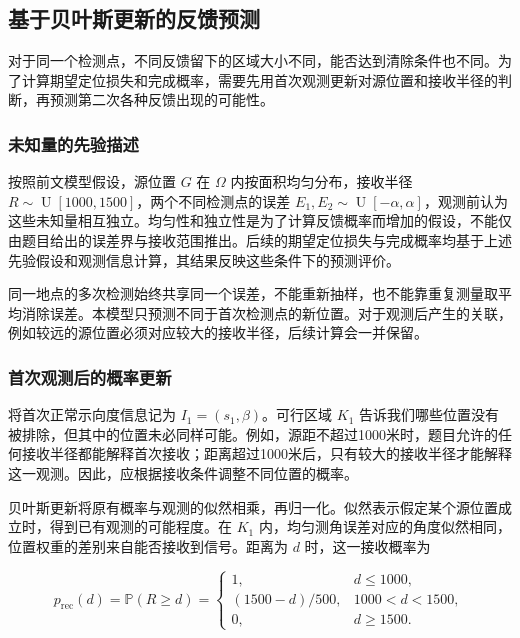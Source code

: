 \documentclass[UTF8,a4paper,zihao=-4,fontset=none]{ctexart}
\begin{document}
\subsection{基于贝叶斯更新的反馈预测}

对于同一个检测点，不同反馈留下的区域大小不同，能否达到清除条件也不同。为了计算期望定位损失和完成概率，需要先用首次观测更新对源位置和接收半径的判断，再预测第二次各种反馈出现的可能性。

\subsubsection{未知量的先验描述}

按照前文模型假设，源位置 \(G\) 在 \(\Omega\) 内按面积均匀分布，接收半径 \(R\sim\operatorname{U}[1000,1500]\)，两个不同检测点的误差 \(E_1,E_2\sim\operatorname{U}[-\alpha,\alpha]\)，观测前认为这些未知量相互独立。均匀性和独立性是为了计算反馈概率而增加的假设，不能仅由题目给出的误差界与接收范围推出。后续的期望定位损失与完成概率均基于上述先验假设和观测信息计算，其结果反映这些条件下的预测评价。

同一地点的多次检测始终共享同一个误差，不能重新抽样，也不能靠重复测量取平均消除误差。本模型只预测不同于首次检测点的新位置。对于观测后产生的关联，例如较远的源位置必须对应较大的接收半径，后续计算会一并保留。

\subsubsection{首次观测后的概率更新}

将首次正常示向度信息记为 \(I_1=(s_1,\beta)\)。可行区域 \(K_1\) 告诉我们哪些位置没有被排除，但其中的位置未必同样可能。例如，源距不超过1000米时，题目允许的任何接收半径都能解释首次接收；距离超过1000米后，只有较大的接收半径才能解释这一观测。因此，应根据接收条件调整不同位置的概率。

贝叶斯更新将原有概率与观测的似然相乘，再归一化。似然表示假定某个源位置成立时，得到已有观测的可能程度。在 \(K_1\) 内，均匀测角误差对应的角度似然相同，位置权重的差别来自能否接收到信号。距离为 \(d\) 时，这一接收概率为

\begin{equation}
 p_{\mathrm{rec}}(d)=\mathbb{P}(R\ge d)=
 \begin{cases}
 1,&d\le1000,\\
 (1500-d)/500,&1000<d<1500,\\
 0,&d\ge1500.
 \end{cases}
\label{eq:q2-pair-weight}
\end{equation}
\end{document}
